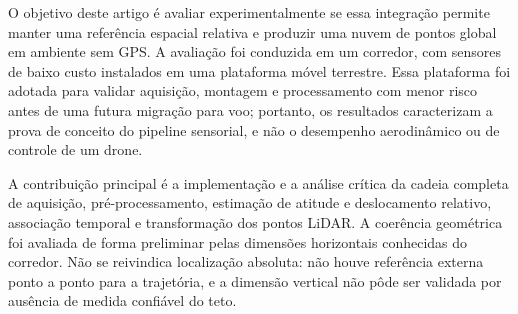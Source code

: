 O objetivo deste artigo é avaliar experimentalmente se essa integração permite manter uma referência espacial relativa e produzir uma nuvem de pontos global em ambiente sem GPS. A avaliação foi conduzida em um corredor, com sensores de baixo custo instalados em uma plataforma móvel terrestre. Essa plataforma foi adotada para validar aquisição, montagem e processamento com menor risco antes de uma futura migração para voo; portanto, os resultados caracterizam a prova de conceito do pipeline sensorial, e não o desempenho aerodinâmico ou de controle de um drone.

A contribuição principal é a implementação e a análise crítica da cadeia completa de aquisição, pré-processamento, estimação de atitude e deslocamento relativo, associação temporal e transformação dos pontos LiDAR. A coerência geométrica foi avaliada de forma preliminar pelas dimensões horizontais conhecidas do corredor. Não se reivindica localização absoluta: não houve referência externa ponto a ponto para a trajetória, e a dimensão vertical não pôde ser validada por ausência de medida confiável do teto.
